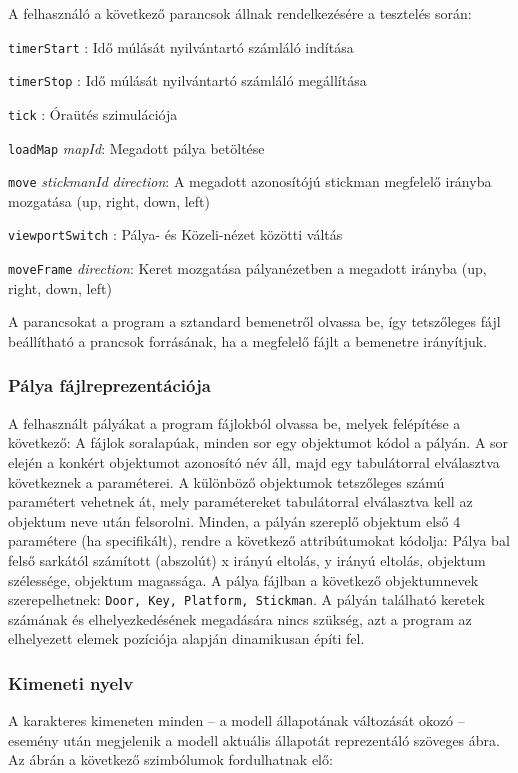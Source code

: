 	    A felhasználó a következő parancsok állnak rendelkezésére a tesztelés során:
	    
	    \newcommand{\cmd}[1]{\item{\texttt{#1}} }
	    \begin{description}
	        \cmd{timerStart}: Idő múlását nyilvántartó számláló indítása
	        \cmd{timerStop}: Idő múlását nyilvántartó számláló megállítása
	        \cmd{tick}: Óraütés szimulációja
	        \cmd{loadMap} \emph{mapId}: Megadott pálya betöltése
	        \cmd{move} \emph{stickmanId} \emph{direction}: A megadott azonosítójú stickman megfelelő irányba mozgatása (up, right, down, left)
	        \cmd{viewportSwitch}: Pálya- és Közeli-nézet közötti váltás
	        \cmd{moveFrame} \emph{direction}: Keret mozgatása pályanézetben a megadott irányba (up, right, down, left)
        \end{description}
        
        A parancsokat a program a sztandard bemenetről olvassa be, így tetszőleges fájl beállítható a prancsok forrásának, ha a megfelelő fájlt a bemenetre irányítjuk.
        
        \subsubsection{Pálya fájlreprezentációja}
        A felhasznált pályákat a program fájlokból olvassa be, melyek felépítése a következő: A fájlok soralapúak, minden sor egy objektumot kódol a pályán. A sor elején a konkért objektumot azonosító név áll, majd egy tabulátorral elválasztva következnek a paraméterei. A különböző objektumok tetszőleges számú paramétert vehetnek át, mely paramétereket tabulátorral elválasztva kell az objektum neve után felsorolni. Minden, a pályán szereplő objektum első 4 paramétere (ha specifikált), rendre a következő attribútumokat kódolja: Pálya bal felső sarkától számított (abszolút) x irányú eltolás, y irányú eltolás, objektum szélessége, objektum magassága. A pálya fájlban a következő objektumnevek szerepelhetnek: \texttt{Door, Key, Platform, Stickman}. A pályán található keretek számának és elhelyezkedésének megadására nincs szükség, azt a program az elhelyezett elemek pozíciója alapján dinamikusan építi fel.
        
	    \subsubsection{Kimeneti nyelv}	
	    A karakteres kimeneten minden -- a modell állapotának változását okozó -- esemény után megjelenik a modell aktuális állapotát reprezentáló szöveges ábra. Az ábrán a következő szimbólumok fordulhatnak elő:
	    
